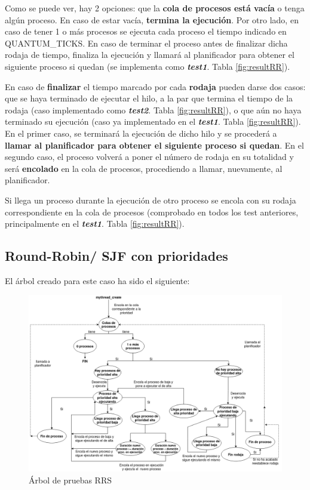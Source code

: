\documentclass[10pt, spanish, pdftex]{template/UC3M_document}
\begin{document}
Como se puede ver, hay 2 opciones: que la \textbf{cola de procesos está vacía} o tenga algún proceso. En caso de estar vacía, \textbf{termina la ejecución}. Por otro lado, en caso de tener 1 o más procesos se ejecuta cada proceso el tiempo indicado en QUANTUM\_TICKS. En caso de terminar el proceso antes de finalizar dicha rodaja de tiempo, finaliza la ejecución y llamará al planificador para obtener el siguiente proceso si quedan (se implementa como \textbf{\textit{test1}}. Tabla \ref{fig:resultRR}).  

En caso de \textbf{finalizar} el tiempo marcado por cada \textbf{rodaja} pueden darse dos casos: que se haya terminado de ejecutar el hilo, a la par que termina el tiempo de la rodaja (caso implementado como \textbf{\textit{test2}}. Tabla \ref{fig:resultRR}), o que aún no haya terminado su ejecución (caso ya implementado en el \textbf{\textit{test1}}. Tabla \ref{fig:resultRR}). En el primer caso, se terminará la ejecución de dicho hilo y se procederá a \textbf{llamar al planificador para obtener el siguiente proceso si quedan}. En el segundo caso, el proceso volverá a poner el número de rodaja en su totalidad y será \textbf{encolado} en la cola de procesos, procediendo a llamar, nuevamente, al planificador.

Si llega un proceso durante la ejecución de otro proceso se encola con su rodaja correspondiente en la cola de procesos (comprobado en todos los test anteriores, principalmente en el \textbf{\textit{test1}}. Tabla \ref{fig:resultRR}).

\subsection{Round-Robin/ SJF con prioridades}
El árbol creado para este caso ha sido el siguiente:
\vspace{0.5cm}
\begin{figure}[h]
    \centering
    \includegraphics[width=14cm]{arboles/testRRS.png}
    \caption{Árbol de pruebas RRS}
\end{figure}
\end{document}
